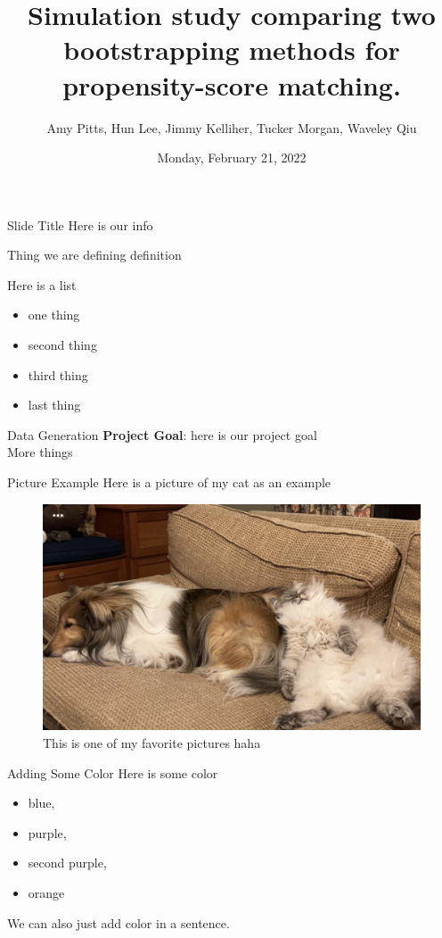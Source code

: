 \documentclass{beamer}
\title[P8160]{Simulation study comparing two bootstrapping methods for propensity-score matching.
 }
\author[Group 4]{Amy Pitts, Hun Lee, Jimmy Kelliher, Tucker Morgan, Waveley Qiu
}
\date{Monday, February 21, 2022}
\begin{document}
\begin{frame}
  \titlepage
\end{frame}


\begin{frame}{Slide Title}
    Here is our info  
    \medskip 
    \begin{block}{Thing we are defining }
    definition 
    \end{block}
    \bigskip
    Here is a list
    \begin{itemize}
        \item one thing
        \item second thing  
        \item third thing 
        \item last thing 
    \end{itemize}
\end{frame}


\begin{frame}{Data Generation}
    \textbf{Project Goal}: here is our project goal 
    \\ \bigskip
    More things 
\end{frame}


\begin{frame}{Picture Example}
    Here is a picture of my cat as an example 
    \begin{figure}
        \centering
        \includegraphics[scale=0.15]{petra.jpg}
        \caption{This is one of my favorite pictures haha }
        \label{fig:my_label}
    \end{figure}
\end{frame}


\begin{frame}{Adding Some Color}
    Here is some color   
    \begin{itemize}
        \color{blue}
        \item blue, 
        \color{purple}
        \item purple, 
        \item second purple, 
        \color{orange}
        \item orange
    \end{itemize}
    We can also just add  {\color{blue}color}  in a sentence. 
\end{frame}
\end{document}
